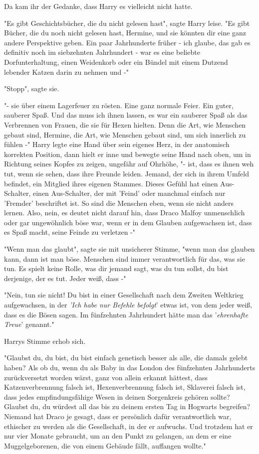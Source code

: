 {Da kam ihr der Gedanke, dass Harry es vielleicht nicht hatte.

"Es gibt Geschichtsbücher, die du nicht gelesen hast", sagte Harry leise. "Es gibt Bücher, die du noch nicht gelesen hast, Hermine, und sie könnten dir eine ganz andere Perspektive geben. Ein paar Jahrhunderte früher - ich glaube, das gab es definitiv noch im siebzehnten Jahrhundert - war es eine beliebte Dorfunterhaltung, einen Weidenkorb oder ein Bündel mit einem Dutzend lebender Katzen darin zu nehmen und -"

"Stopp", sagte sie.

"- sie über einem Lagerfeuer zu rösten. Eine ganz normale Feier. Ein guter, sauberer Spaß. Und das muss ich ihnen lassen, es war ein sauberer Spaß als das Verbrennen von Frauen, die sie für Hexen hielten. Denn die Art, wie Menschen gebaut sind, Hermine, die Art, wie Menschen gebaut sind, um sich innerlich zu fühlen -" Harry legte eine Hand über sein eigenes Herz, in der anatomisch korrekten Position, dann hielt er inne und bewegte seine Hand nach oben, um in Richtung seines Kopfes zu zeigen, ungefähr auf Ohrhöhe, "- ist, dass es ihnen weh tut, wenn sie sehen, dass ihre Freunde leiden. Jemand, der sich in ihrem Umfeld befindet, ein Mitglied ihres eigenen Stammes. Dieses Gefühl hat einen Aus-Schalter, einen Aus-Schalter, der mit 'Feind' oder manchmal einfach nur 'Fremder' beschriftet ist. So sind die Menschen eben, wenn sie nicht anders lernen. Also, nein, es deutet nicht darauf hin, dass Draco Malfoy unmenschlich oder gar ungewöhnlich böse war, wenn er in dem Glauben aufgewachsen ist, dass es Spaß macht, seine Feinde zu verletzen -"

"Wenn man das glaubt", sagte sie mit unsicherer Stimme, "wenn man das glauben kann, dann ist man böse. Menschen sind immer verantwortlich für das, was sie tun. Es spielt keine Rolle, was dir jemand sagt, was du tun sollst, du bist derjenige, der es tut. Jeder weiß, dass -"

"Nein, tun sie nicht! Du bist in einer Gesellschaft nach dem Zweiten Weltkrieg aufgewachsen, in der \emph{'Ich habe nur Befehle befolgt}' etwas ist, von dem jeder weiß, dass es die Bösen sagen. Im fünfzehnten Jahrhundert hätte man das '\emph{ehrenhafte Treue}' genannt."

Harrys Stimme erhob sich.

"Glaubst du, du bist, du bist einfach genetisch besser als alle, die damals gelebt haben? Als ob du, wenn du als Baby in das London des fünfzehnten Jahrhunderts zurückversetzt worden wärst, ganz von allein erkannt hättest, dass Katzenverbrennung falsch ist, Hexenverbrennung falsch ist, Sklaverei falsch ist, dass jedes empfindungsfähige Wesen in deinen Sorgenkreis gehören sollte? Glaubst du, du würdest all das bis zu deinem ersten Tag in Hogwarts begreifen? Niemand hat Draco je gesagt, dass er persönlich dafür verantwortlich war, ethischer zu werden als die Gesellschaft, in der er aufwuchs. Und trotzdem hat er nur vier Monate gebraucht, um an den Punkt zu gelangen, an dem er eine Muggelgeborenen, die von einem Gebäude fällt, auffangen wollte."

}
